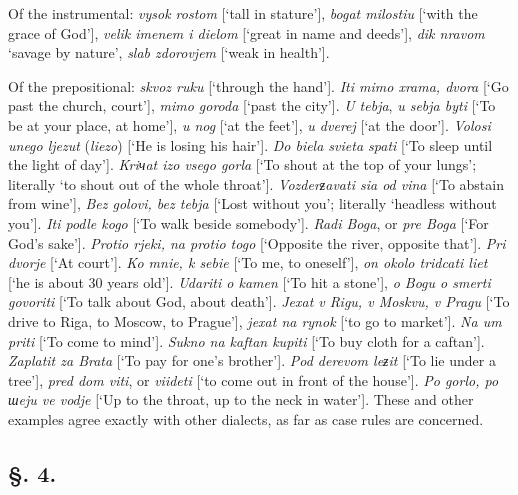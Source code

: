 Of the instrumental: \textit{vysok rostom} [‘tall in stature’], \textit{bogat milostiu} [‘with the grace of God’], \textit{velik imenem i dielom} [‘great in name and deeds’], \textit{dik nravom} ‘savage by nature’, \textit{slab zdorovjem} [‘weak in health’].

Of the prepositional: \textit{skvoz ruku} [‘through the hand’]. \textit{Iti mimo xrama, dvora} [‘Go past the church, court’], \textit{mimo goroda} [‘past the city’]. \textit{U tebja}, \textit{u sebja byti} [‘To be at your place, at home’], \textit{u nog} [‘at the feet’], \textit{u dverej} [‘at the door’]. \textit{Volosi unego ljezut} (\textit{liezo}) [‘He is losing his hair’]. \textit{Do biela svieta spati} [‘To sleep until the light of day’]. \textit{Kriчat izo vsego gorla} [‘To shout at the top of your lungs’; literally ‘to shout out of the whole throat’]. \textit{Vozderƶavati sia od vina} [‘To abstain from wine’], \textit{Bez golovi, bez tebja} [‘Lost without you’; literally ‘headless without you’]. \textit{Iti podle kogo} [‘To walk beside somebody’]. \textit{Radi Boga}, or \textit{pre Boga} [‘For God’s sake’]. \textit{Protio rjeki, na protio togo} [‘Opposite the river, opposite that’]. \textit{Pri dvorje} [‘At court’]. \textit{Ko mnie, k sebie} [‘To me, to oneself’], \textit{on okolo tridcati liet} [‘he is about 30 years old’]. \textit{Udariti o kamen} [‘To hit a stone’], \textit{o Bogu o smerti govoriti} [‘To talk about God, about death’]. \textit{Jexat v Rigu, v Moskvu, v Pragu} [‘To drive to Riga, to Moscow, to Prague’], \textit{jexat na rynok} [‘to go to market’]. \textit{Na um priti} [‘To come to mind’]. \textit{Sukno na kaftan kupiti} [‘To buy cloth for a caftan’]. \textit{Zaplatit za Brata} [‘To pay for one’s brother’]. \textit{Pod derevom leƶit} [‘To lie under a tree’], \textit{pred dom viti}, or \textit{viideti} [‘to come out in front of the house’]. \textit{Po gorlo, po шeju ve vodje} \linebreak{}\newpage{}\noindent{}[‘Up to the throat, up to the neck in water’]. These and other examples agree exactly with other dialects, as far as case rules are concerned.

\subsection*{\hspace*{\fill}§. 4.\hspace*{\fill}}

